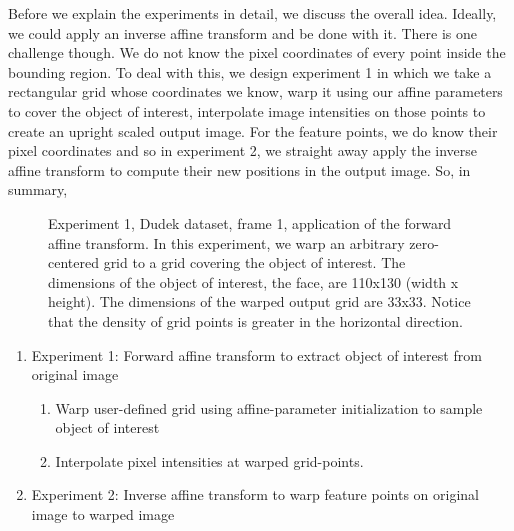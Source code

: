 Before we explain the experiments in detail, we discuss the overall idea.  Ideally, we could apply an inverse affine transform and be done with it.  There is one challenge though.  We do not know the pixel coordinates of every point inside the bounding region.  To deal with this, we design experiment 1 in which we take a rectangular grid whose coordinates we know, warp it using our affine parameters to cover the object of interest, interpolate image intensities on those points to create an upright scaled output image.  For the feature points, we do know their pixel coordinates and so in experiment 2, we straight away apply the inverse affine transform to compute their new positions in the output image.  So, in summary,

								\begin{figure}[t]
								\centering
								\caption{Experiment 1, Dudek dataset, frame 1, application of the forward affine transform.  In this experiment, we warp an arbitrary zero-centered grid to a grid covering the object of interest.  The dimensions of the object of interest, the face, are 110x130 (width x height).  The dimensions of the warped output grid are 33x33.  Notice that the density of grid points is greater in the horizontal direction.}
								\label{Fig:affine_warping}
								\end{figure}



\begin{enumerate}
\item Experiment 1: Forward affine transform to extract object of interest from original image
\begin{enumerate}
\item Warp user-defined grid using affine-parameter initialization to sample object of interest
\item Interpolate pixel intensities at warped grid-points.
\end{enumerate}
\item Experiment 2: Inverse affine transform to warp feature points on original image to warped image
\end{enumerate}


